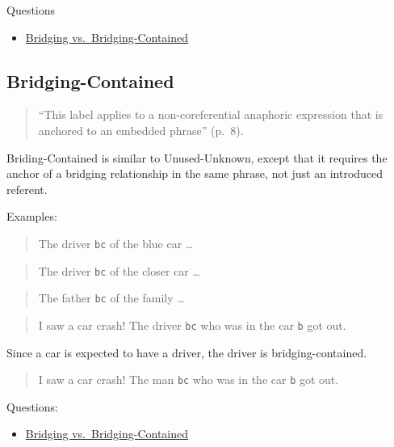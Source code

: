 \documentclass[
]{book}
\providecommand{\tightlist}{%
  \setlength{\itemsep}{0pt}\setlength{\parskip}{0pt}}
\begin{document}
Questions

\begin{itemize}
\tightlist
\item
  \protect\hyperlink{bridging-vs.-bridging-contained}{Bridging vs.~Bridging-Contained}
\end{itemize}

\hypertarget{bridging-contained}{%
\subsection{Bridging-Contained}\label{bridging-contained}}

\begin{quote}
``This label applies to a non-coreferential anaphoric expression that is anchored to an embedded phrase'' (p.~8).
\end{quote}

Briding-Contained is similar to Unused-Unknown, except that it requires the anchor of a bridging relationship in the same phrase, not just an introduced referent.

Examples:

\begin{quote}
The driver \texttt{bc} of the blue car \ldots{}
\end{quote}

\begin{quote}
The driver \texttt{bc} of the closer car \ldots{}
\end{quote}

\begin{quote}
The father \texttt{bc} of the family \ldots{}
\end{quote}

\begin{quote}
I saw a car crash! The driver \texttt{bc} who was in the car \texttt{b} got out.
\end{quote}

Since a car is expected to have a driver, the driver is bridging-contained.

\begin{quote}
I saw a car crash! The man \texttt{bc} who was in the car \texttt{b} got out.
\end{quote}

Questions:

\begin{itemize}
\tightlist
\item
  \protect\hyperlink{bridging-vs.-bridging-contained}{Bridging vs.~Bridging-Contained}
\end{itemize}
\end{document}
